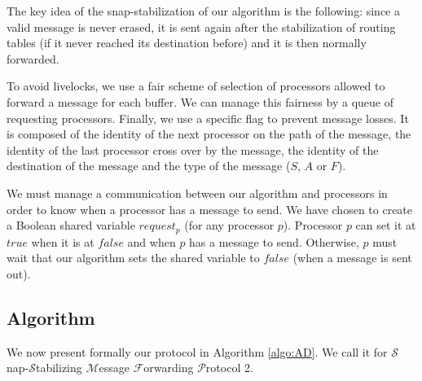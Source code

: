 \documentclass[11pt]{article}
\begin{document}
The key idea of the snap-stabilization of our algorithm is the following: since a valid message is never erased, it is sent again after the stabilization of routing tables (if it never reached its destination before) and it is then normally forwarded. 

To avoid livelocks, we use a fair scheme of selection of processors allowed to forward a message for each buffer. We can manage this fairness by a queue of requesting processors. Finally, we use a specific flag to prevent message losses. It is composed of the identity of the next processor on the path of the message, the identity of the last processor cross over by the message, the identity of the destination of the message and the type of the message ($S$, $A$ or $F$).

We must manage a communication between our algorithm and processors in order to know when a processor has a message to send. We have chosen to create a Boolean shared variable $request_{p}$ (for any processor $p$). Processor $p$ can set it at $true$ when it is at $false$ and when $p$ has a message to send. Otherwise, $p$ must wait that our algorithm sets the shared variable to $false$ (when a message is sent out).

\subsection{Algorithm}

We now present formally our protocol in Algorithm \ref{algo:AD}. We call it \AD for $\mathcal{S}$nap-$\mathcal{S}$tabilizing $\mathcal{M}$essage $\mathcal{F}$orwarding $\mathcal{P}$rotocol 2.
\end{document}
